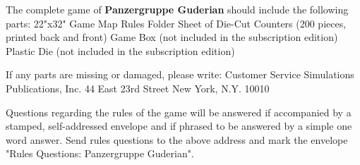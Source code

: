The complete game of \textbf{Panzergruppe Guderian} should include the following parts:
22"x32" Game Map
Rules Folder
Sheet of Die-Cut Counters (200 pieces, printed back and front)
Game Box (not included in the subscription edition)
Plastic Die (not included in the subscription edition)

If any parts are missing or damaged, please write:
Customer Service
Simulations Publications, Inc.
44 East 23rd Street
New York, N.Y. 10010

Questions regarding the rules of the game will be answered if accompanied by a stamped, self-addressed envelope and if phrased to be answered by a simple one word answer. Send rules questions to the above address and mark the envelope "Rules Questions: Panzergruppe Guderian".